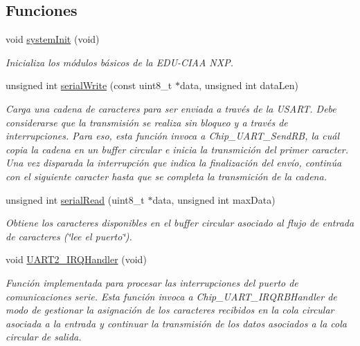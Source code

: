 \subsection*{Funciones}
\begin{DoxyCompactItemize}
\item 
void \hyperlink{group__hardware_gab11a117f1e08391f23d1da05930e7acf}{system\+Init} (void)
\begin{DoxyCompactList}\small\item\em Inicializa los módulos básicos de la E\+D\+U-\/\+C\+I\+AA N\+XP. \end{DoxyCompactList}\item 
unsigned int \hyperlink{group__hardware_ga461352be081cdef66d03a73226849b41}{serial\+Write} (const uint8\+\_\+t $\ast$data, unsigned int data\+Len)
\begin{DoxyCompactList}\small\item\em Carga una cadena de caracteres para ser enviada a través de la U\+S\+A\+RT. Debe considerarse que la transmisión se realiza sin bloqueo y a través de interrupciones. Para eso, esta función invoca a Chip\+\_\+\+U\+A\+R\+T\+\_\+\+Send\+RB, la cuál copia la cadena en un buffer circular e inicia la transmición del primer caracter. Una vez disparada la interrupción que indica la finalización del envío, continúa con el siguiente caracter hasta que se completa la transmición de la cadena. \end{DoxyCompactList}\item 
unsigned int \hyperlink{group__hardware_ga39a8d4e4fafda759632e362b701d6338}{serial\+Read} (uint8\+\_\+t $\ast$data, unsigned int max\+Data)
\begin{DoxyCompactList}\small\item\em Obtiene los caracteres disponibles en el buffer circular asociado al flujo de entrada de caracteres (\char`\"{}lee el puerto\char`\"{}). \end{DoxyCompactList}\item 
void \hyperlink{group__hardware_gac20eca44aeea90e6f603831193cc9b28}{U\+A\+R\+T2\+\_\+\+I\+R\+Q\+Handler} (void)
\begin{DoxyCompactList}\small\item\em Función implementada para procesar las interrupciones del puerto de comunicaciones serie. Esta función invoca a Chip\+\_\+\+U\+A\+R\+T\+\_\+\+I\+R\+Q\+R\+B\+Handler de modo de gestionar la asignación de los caracteres recibidos en la cola circular asociada a la entrada y continuar la transmisión de los datos asociados a la cola circular de salida. \end{DoxyCompactList}\item 

\end{DoxyCompactItemize}
